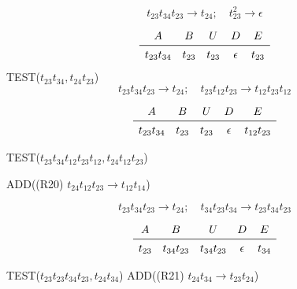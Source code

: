 \documentclass[worked-example]{subfiles}
\begin{document}
\[
t_{23} t_{34} t_{23} \rightarrow t_{24} ; \quad
t_{23}^2 \rightarrow \epsilon
\]

\[
\begin{array}{ccccc}
A & B & U & D & E \\
\midrule
t_{23} t_{34}  & t_{23} & t_{23} & \epsilon  & t_{23}\\
\end{array}
\]
TEST($t_{23} t_{34}, t_{24}t_{23}$)
\[
t_{23} t_{34} t_{23} \rightarrow t_{24} ; \quad
t_{23} t_{12} t_{23} \rightarrow t_{12} t_{23} t_{12}
\]

\[
\begin{array}{ccccc}
A & B & U & D & E \\
\midrule
t_{23} t_{34}  & t_{23} & t_{23} & \epsilon  & t_{12} t_{23}\\
\end{array}
\]

TEST($t_{23} t_{34}t_{12} t_{23} t_{12}, t_{24}t_{12} t_{23}$)

ADD((R20) $t_{24}t_{12} t_{23} \rightarrow t_{12} t_{14}$)

\[
t_{23} t_{34} t_{23} \rightarrow t_{24} ; \quad
t_{34} t_{23} t_{34} \rightarrow t_{23} t_{34} t_{23}
\]

\[
\begin{array}{ccccc}
A & B & U & D & E \\
\midrule
t_{23} & t_{34}t_{23} & t_{34}t_{23} & \epsilon  & t_{34}\\
\end{array}
\]

TEST($t_{23}t_{23} t_{34} t_{23}, t_{24}t_{34}$)
ADD((R21) $t_{24}t_{34} \rightarrow t_{23}t_{24}$)
\end{document}
